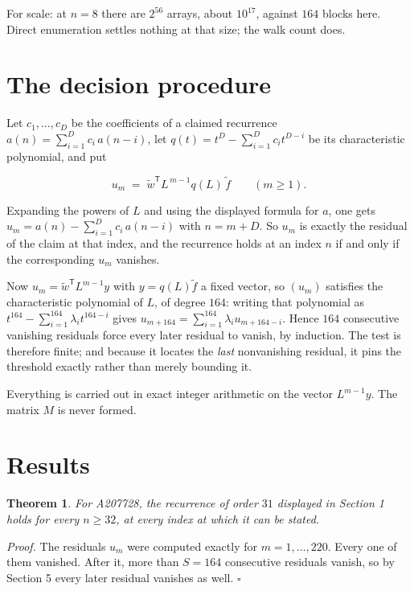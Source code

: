 \documentclass[11pt]{article}
\newtheorem{theorem}{Theorem}
\theoremstyle{definition}
\begin{document}
For scale: at $n = 8$ there are $2^{56}$ arrays, about $10^{17}$, against $164$ blocks here. Direct enumeration settles nothing at that size; the walk count does.

\section{The decision procedure}

Let $c_1,\dots,c_D$ be the coefficients of a claimed recurrence $a(n) = \sum_{i=1}^{D} c_i\,a(n-i)$, let $q(t) = t^{D} - \sum_{i=1}^{D} c_i t^{D-i}$ be its characteristic polynomial, and put

\[u_m \;=\; \tilde w^{\mathsf T} L^{\,m-1} q(L)\,\tilde f \qquad (m \ge 1).\]

Expanding the powers of $L$ and using the displayed formula for $a$, one gets $u_m = a(n) - \sum_{i=1}^{D} c_i\,a(n-i)$ with $n = m + D$. So $u_m$ is exactly the residual of the claim at that index, and the recurrence holds at an index $n$ if and only if the corresponding $u_m$ vanishes.

Now $u_m = \tilde w^{\mathsf T} L^{m-1} y$ with $y = q(L)\tilde f$ a fixed vector, so $(u_m)$ satisfies the characteristic polynomial of $L$, of degree $164$: writing that polynomial as $t^{164} - \sum_{i=1}^{164} \lambda_i t^{164-i}$ gives $u_{m+164} = \sum_{i=1}^{164} \lambda_i u_{m+164-i}$. Hence $164$ consecutive vanishing residuals force every later residual to vanish, by induction. The test is therefore finite; and because it locates the {\itshape last} nonvanishing residual, it pins the threshold exactly rather than merely bounding it.

Everything is carried out in exact integer arithmetic on the vector $L^{m-1}y$. The matrix $M$ is never formed.

\section{Results}

\begin{theorem} For A207728, the recurrence of order $31$ displayed in Section 1 holds for every $n \ge 32$, at every index at which it can be stated.\end{theorem}

{\itshape Proof.} The residuals $u_m$ were computed exactly for $m = 1,\dots,220$. Every one of them vanished. After it, more than $S = 164$ consecutive residuals vanish, so by Section 5 every later residual vanishes as well. $\square$
\end{document}
